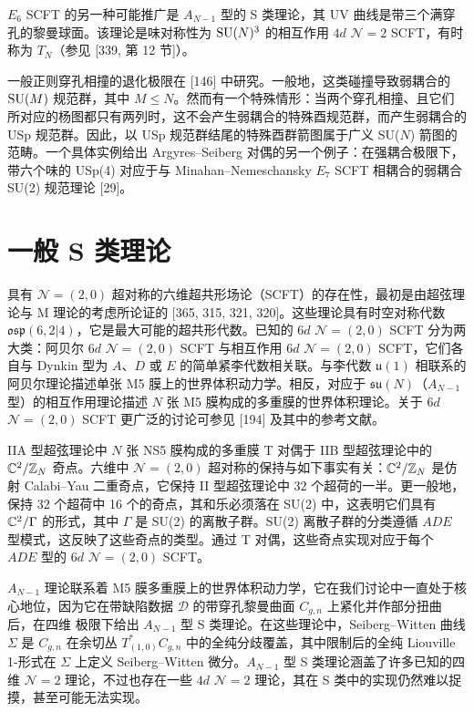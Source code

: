 $E_6$ SCFT 的另一种可能推广是 $A_{N-1}$ 型的 S 类理论，其 UV 曲线是带三个满穿孔的黎曼球面。该理论是味对称性为 $\operatorname{SU}(N)^3$ 的相互作用 $4d$ $\mathcal{N}=2$ SCFT，有时称为 $T_N$（参见 [339, 第 12 节]）。

一般正则穿孔相撞的退化极限在 [146] 中研究。一般地，这类碰撞导致弱耦合的 $\operatorname{SU}(M)$ 规范群，其中 $M\le N$。然而有一个特殊情形：当两个穿孔相撞、且它们所对应的杨图都只有两列时，这不会产生弱耦合的特殊酉规范群，而产生弱耦合的 USp 规范群。因此，以 USp 规范群结尾的特殊酉群箭图属于广义 SU($N$) 箭图的范畴。一个具体实例给出 Argyres–Seiberg 对偶的另一个例子：在强耦合极限下，带六个味的 USp(4) 对应于与 Minahan–Nemeschansky $E_7$ SCFT 相耦合的弱耦合 SU(2) 规范理论 [29]。

\section{一般 S 类理论}

具有 $\mathcal{N}=(2,0)$ 超对称的六维超共形场论（SCFT）的存在性，最初是由超弦理论与 M 理论的考虑所论证的 [365, 315, 321, 320]。这些理论具有时空对称代数 $\mathfrak{osp}(6,2|4)$，它是最大可能的超共形代数。已知的 $6d$ $\mathcal{N}=(2,0)$ SCFT 分为两大类：阿贝尔 $6d$ $\mathcal{N}=(2,0)$ SCFT 与相互作用 $6d$ $\mathcal{N}=(2,0)$ SCFT，它们各自与 Dynkin 型为 $A$、$D$ 或 $E$ 的简单紧李代数相关联。与李代数 $\mathfrak{u}(1)$ 相联系的阿贝尔理论描述单张 M5 膜上的世界体积动力学。相反，对应于 $\mathfrak{su}(N)$（$A_{N-1}$ 型）的相互作用理论描述 $N$ 张 M5 膜构成的多重膜的世界体积理论。关于 $6d$ $\mathcal{N}=(2,0)$ SCFT 更广泛的讨论可参见 [194] 及其中的参考文献。

IIA 型超弦理论中 $N$ 张 NS5 膜构成的多重膜 T 对偶于 IIB 型超弦理论中的 $\mathbb{C}^2/\mathbb{Z}_N$ 奇点。六维中 $\mathcal{N}=(2,0)$ 超对称的保持与如下事实有关：$\mathbb{C}^2/\mathbb{Z}_N$ 是仿射 Calabi–Yau 二重奇点，它保持 II 型超弦理论中 32 个超荷的一半。更一般地，保持 32 个超荷中 16 个的奇点，其和乐必须落在 SU(2) 中，这表明它们具有 $\mathbb{C}^2/\Gamma$ 的形式，其中 $\Gamma$ 是 SU(2) 的离散子群。SU(2) 离散子群的分类遵循 $ADE$ 型模式，这反映了这些奇点的类型。通过 T 对偶，这些奇点实现对应于每个 $ADE$ 型的 $6d$ $\mathcal{N}=(2,0)$ SCFT。

$A_{N-1}$ 理论联系着 M5 膜多重膜上的世界体积动力学，它在我们讨论中一直处于核心地位，因为它在带缺陷数据 $\mathcal{D}$ 的带穿孔黎曼曲面 $C_{g,n}$ 上紧化并作部分扭曲后，在四维
极限下给出 $A_{N-1}$ 型 S 类理论。在这些理论中，Seiberg–Witten 曲线 $\Sigma$ 是 $C_{g,n}$ 在余切丛 $T^*_{(1,0)}C_{g,n}$ 中的全纯分歧覆盖，其中限制后的全纯 Liouville 1-形式在 $\Sigma$ 上定义 Seiberg–Witten 微分。$A_{N-1}$ 型 S 类理论涵盖了许多已知的四维 $\mathcal{N}=2$ 理论，不过也存在一些 $4d$ $\mathcal{N}=2$ 理论，其在 S 类中的实现仍然难以捉摸，甚至可能无法实现。

